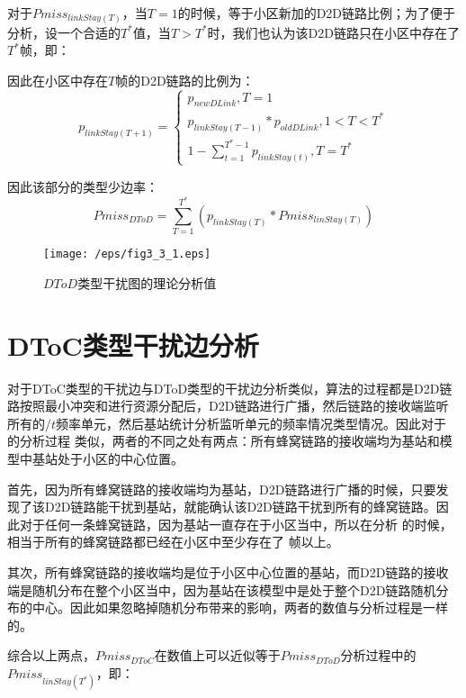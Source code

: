 \documentclass[figurelist,tablelist,algorithmlist,nomlist,masters]{seuthesix}
\begin{document}
	对于$Pmis{s_{linkStay(T)}}$，当$T=1$的时候，等于小区新加的D2D链路比例；为了便于分析，设一个合适的$T^*$值，当$T > T^*$时，我们也认为该D2D链路只在小区中存在了$T^*$帧，即：
	
	因此在小区中存在$T$帧的D2D链路的比例为：
	\begin{equation}\label{eq3.1}
	{p_{linkStay(T + 1)}} = \left\{ \begin{array}{l}
	{p_{newDLink}},T = 1\\
	{p_{linkStay(T - 1)}}*{p_{oldDLink}},1 < T < T^* \\
	1 - \sum\limits_{t = 1}^{{T^*} - 1} {{p_{linkStay(t)}}} ,T = T^*
	\end{array} \right.
	\end{equation}
	
	因此该部分的类型少边率：
	\begin{equation}\label{eq3.1}
	Pmis{s_{DToD}} = \sum\limits_{T = 1}^{{T^*}} {({p_{linkStay(T)}}*Pmis{s_{linStay(T)}})}
	\end{equation}
	
	\begin{figure}[!h]
		\centering
		\texttt{[image: /eps/fig3\_3\_1.eps]}
		\caption{$DToD$类型干扰图的理论分析值}
		\label{fig3_3_1}
	\end{figure}
	
	
	\section{DToC类型干扰边分析}
	对于DToC类型的干扰边与DToD类型的干扰边分析类似，算法的过程都是D2D链路按照最小冲突和进行资源分配后，D2D链路进行广播，然后链路的接收端监听所有的$/t$频率单元，然后基站统计分析监听单元的频率情况类型情况。因此对于 的分析过程 类似，两者的不同之处有两点：所有蜂窝链路的接收端均为基站和模型中基站处于小区的中心位置。
	
	首先，因为所有蜂窝链路的接收端均为基站，D2D链路进行广播的时候，只要发现了该D2D链路能干扰到基站，就能确认该D2D链路干扰到所有的蜂窝链路。因此对于任何一条蜂窝链路，因为基站一直存在于小区当中，所以在分析 的时候，相当于所有的蜂窝链路都已经在小区中至少存在了 帧以上。
	
	其次，所有蜂窝链路的接收端均是位于小区中心位置的基站，而D2D链路的接收端是随机分布在整个小区当中，因为基站在该模型中是处于整个D2D链路随机分布的中心。因此如果忽略掉随机分布带来的影响，两者的数值与分析过程是一样的。
	
	综合以上两点，$Pmis{s_{DToC}}$在数值上可以近似等于$Pmis{s_{DToD}}$分析过程中的$Pmis{s_{linStay({T^*})}}$，即：
	
\end{document}
